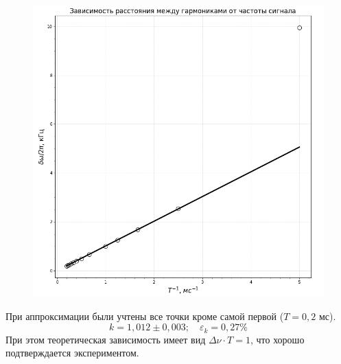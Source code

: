 \documentclass[a4paper,12pt]{article}
\begin{document}
\newpage
\begin{figure}[H]\label{fig: delta_nu(1 / T)}
    \centering
    \includegraphics[width = \textwidth]{delta_nu(T pow-1).png}
\end{figure}
При аппроксимации были учтены все точки кроме самой первой ($T = 0,2$ мс).
\[k = 1,012 \pm 0,003; \quad \varepsilon_k = 0,27\%\]
При этом теоретическая зависимость имеет вид $\Delta \nu \cdot T = 1$, что хорошо подтверждается экспериментом.
\end{document}
